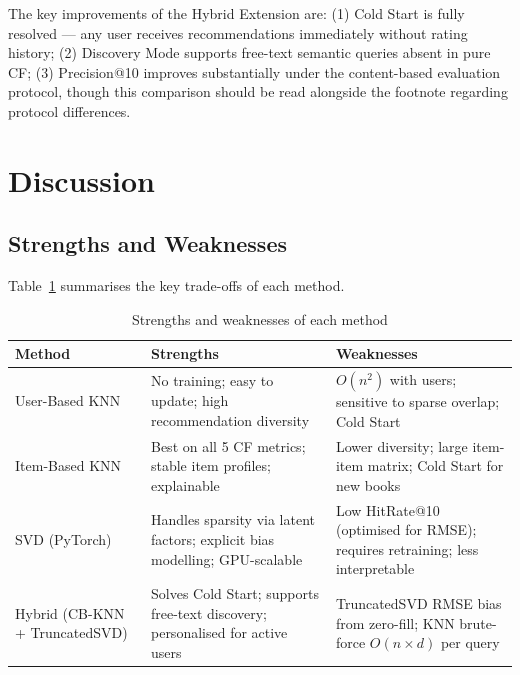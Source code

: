 \documentclass[12pt, a4paper]{article}
\begin{document}
The key improvements of the Hybrid Extension are: (1) Cold Start is fully resolved ---
any user receives recommendations immediately without rating history;
(2) Discovery Mode supports free-text semantic queries absent in pure CF;
(3) Precision@10 improves substantially under the content-based evaluation protocol,
though this comparison should be read alongside the footnote regarding protocol differences.

\newpage
\section{Discussion}
\label{sec:discussion}

\subsection{Strengths and Weaknesses}

Table~\ref{tab:sw} summarises the key trade-offs of each method.

\begin{table}[H]
  \centering
  \caption{Strengths and weaknesses of each method}
  \label{tab:sw}
  \begin{tabular}{|p{2.5cm}|p{5.2cm}|p{5.2cm}|}
    \hline
    \textbf{Method} & \textbf{Strengths} & \textbf{Weaknesses} \\
    \hline
    User-Based KNN
      & No training; easy to update; high recommendation diversity
      & $O(n^2)$ with users; sensitive to sparse overlap; Cold Start \\
    \hline
    Item-Based KNN
      & Best on all 5 CF metrics; stable item profiles; explainable
      & Lower diversity; large item-item matrix; Cold Start for new books \\
    \hline
    SVD (PyTorch)
      & Handles sparsity via latent factors; explicit bias modelling; GPU-scalable
      & Low HitRate@10 (optimised for RMSE); requires retraining; less interpretable \\
    \hline
    Hybrid (CB-KNN + TruncatedSVD)
      & Solves Cold Start; supports free-text discovery; personalised for active users
      & TruncatedSVD RMSE bias from zero-fill; KNN brute-force $O(n \times d)$ per query \\
    \hline
  \end{tabular}
\end{table}
\end{document}
